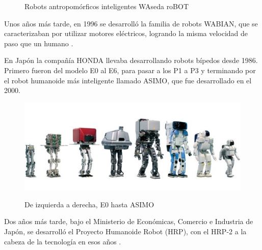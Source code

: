 \begin{figure}[H]
\caption{Robots antropomórficos inteligentes WAseda roBOT}
\label{figura211}
\end{figure}

Unos años más tarde, en 1996 se desarrolló la familia de robots WABIAN, que se caracterizaban por utilizar motores eléctricos, logrando la misma velocidad de paso que un humano \cite{ref8}.

En Japón la compañía HONDA llevaba desarrollando robots bípedos desde 1986. Primero fueron del modelo E0 al E6, para pasar a los P1 a P3 y terminando por el robot humanoide más inteligente llamado ASIMO, que fue desarrollado en el 2000.

\begin{figure}[H]
\centering
{\includegraphics[scale=0.7]{imagenes/apartado_2/212_evolucion_Honda_robots}}
\caption{De izquierda a derecha, E0 hasta ASIMO}
\label{figura212}
\end{figure}

Dos años más tarde, bajo el Ministerio de Económicas, Comercio e Industria de Japón, se desarrolló el Proyecto Humanoide Robot (HRP), con el HRP-2 a la cabeza de la tecnología en esos años \cite{ref22}.

